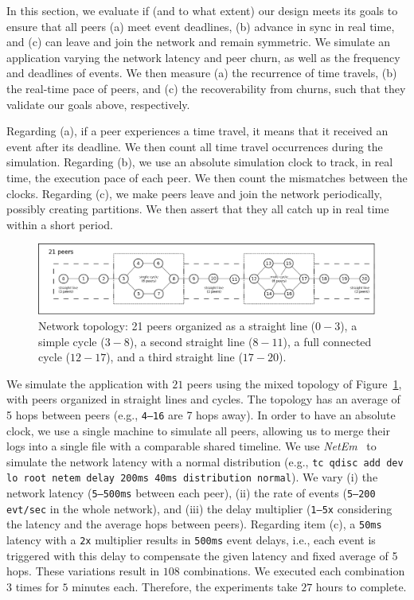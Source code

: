 \documentclass[10pt,journal,compsoc]{IEEEtran}
\newcommand{\code}[1]  {\texttt{\footnotesize{#1}}}
\begin{document}
In this section, we evaluate if (and to what extent) our design meets its goals
to ensure that all peers (a) meet event deadlines, (b) advance in sync in real
time, and (c) can leave and join the network and remain symmetric.
%
We simulate an application varying the network latency and peer churn, as well
as the frequency and deadlines of events.
%
We then measure (a) the recurrence of time travels, (b) the real-time pace of
peers, and (c) the recoverability from churns, such that they validate our
goals above, respectively.

Regarding (a), if a peer experiences a time travel, it means that it received
an event after its deadline.
We then count all time travel occurrences during the simulation.
%
Regarding (b), we use an absolute simulation clock to track, in real time, the
execution pace of each peer.
We then count the mismatches between the clocks.
%
Regarding (c), we make peers leave and join the network periodically, possibly
creating partitions.
We then assert that they all catch up in real time within a short period.

\begin{figure}[t]
  \centering
  \includegraphics[width=\linewidth]{topo}
  \caption{
    \label{fig.topo}
    Network topology: 21 peers organized as a straight line ($0-3$), a simple
    cycle ($3-8$), a second straight line ($8-11$), a full connected cycle
    ($12-17$), and a third straight line ($17-20$).
  }
\end{figure}

We simulate the application with $21$ peers using the mixed topology of
Figure~\ref{fig.topo}, with peers organized in straight lines and cycles.
The topology has an average of 5 hops between peers (e.g., \code{4--16} are 7
hops away).
%
In order to have an absolute clock, we use a single machine to simulate all
peers, allowing us to merge their logs into a single file with a comparable
shared timeline.
%
We use \emph{NetEm}~\cite{netem} to simulate the network latency with a normal
distribution (e.g., \code{tc qdisc add dev lo root netem delay 200ms 40ms
distribution normal}).
%
We vary
    (i)   the network latency (\code{5--500ms} between each peer),
    (ii)  the rate of events (\code{5--200 evt/sec} in the whole network), and
    (iii) the delay multiplier (\code{1--5x} considering the latency and the
          average hops between peers).
Regarding item (c), a \code{50ms} latency with a \code{2x} multiplier results
in \code{500ms} event delays, i.e., each event is triggered with this delay to
compensate the given latency and fixed average of 5 hops.
%
These variations result in $108$ combinations.
We executed each combination $3$ times for $5$ minutes each.
Therefore, the experiments take $27$ hours to complete.
\end{document}
